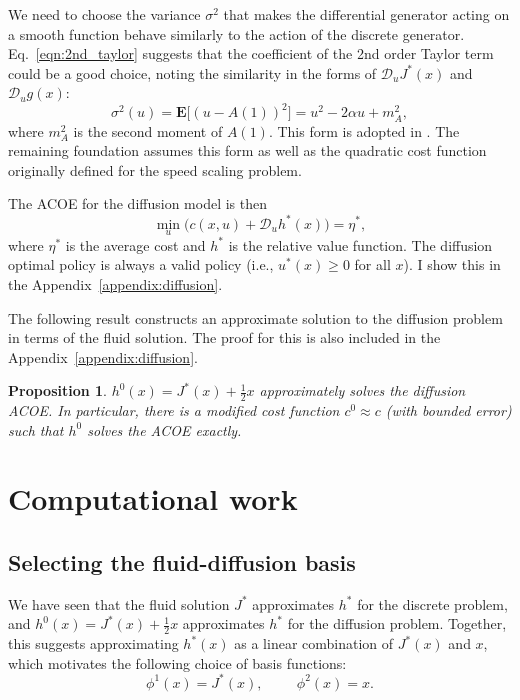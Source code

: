 \documentclass[11pt]{article}
\newtheorem{proposition}{Proposition}
\begin{document}
We need to choose the variance $\sigma^2$ that makes the differential generator acting on a smooth function behave similarly to the action of the discrete generator. Eq.~\ref{eqn:2nd_taylor} suggests that the coefficient of the 2nd order Taylor term could be a good choice, noting the similarity in the forms of $\mathcal{D}_u J^*(x)$ and $\mathcal{D}_u g(x)$:
$$\sigma^2(u) = \mathbf{E}\Big[ (u-A(1))^2\Big] = u^2 - 2\alpha u + m_A^2,$$
where $m_A^2$ is the second moment of $A(1)$. This form is adopted in \cite{paper}. The remaining foundation assumes this form as well as the quadratic cost function originally defined for the speed scaling problem.

The ACOE for the diffusion model is then
$$\min_u \Big( c(x,u) + \mathcal{D}_u h^*(x) \Big) = \eta^*,$$
where $\eta^*$ is the average cost and $h^*$ is the relative value function. The diffusion optimal policy is always a valid policy (i.e., $u^*(x) \geq 0$ for all $x$). I show this in the Appendix~\ref{appendix:diffusion}.

The following result constructs an approximate solution to the diffusion problem in terms of the fluid solution. The proof for this is also included in the Appendix~\ref{appendix:diffusion}.

\begin{proposition}\label{prop:diffusion_result}
$h^0(x) = J^*(x) + \frac{1}{2}x$ approximately solves the diffusion ACOE. In particular, there is a modified cost function $c^0 \approx c$ (with bounded error) such that $h^0$ solves the ACOE exactly.
\end{proposition}

\section{Computational work} \label{sec:computation}

\subsection{Selecting the fluid-diffusion basis}
We have seen that the fluid solution $J^*$ approximates $h^*$ for the discrete problem, and $h^0(x) = J^*(x) + \frac{1}{2}x$ approximates $h^*$ for the diffusion problem. Together, this suggests approximating $h^*(x)$ as a linear combination of $J^*(x)$ and $x$, which motivates the following choice of basis functions:
$$\phi^1(x) = J^*(x), \hspace{1cm} \phi^2(x) = x.$$
\end{document}
